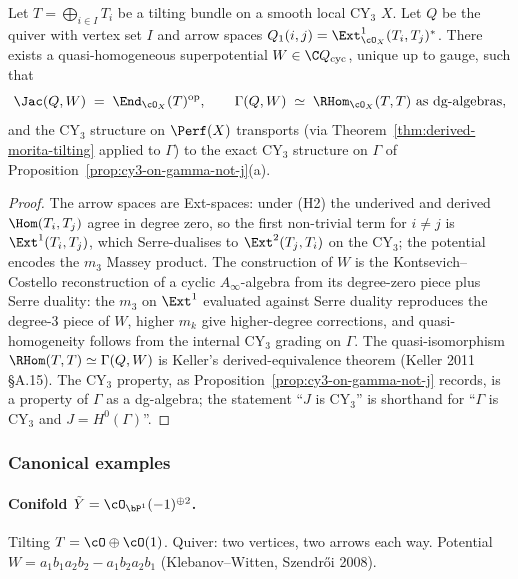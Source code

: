 \begin{theorem}
\label{thm:tilting-jacobi}
Let $T = \bigoplus_{i \in I} T_i$ be a tilting bundle on a
smooth local CY$_3$ $X$. Let $Q$ be the quiver with vertex set $I$ and arrow
spaces $Q_1(i,j) = \Ext^{1}_{\cO_X}(T_i, T_j)^{*}$. There exists a
quasi-homogeneous superpotential $W \in \C Q_{\mathrm{cyc}}$, unique up to
gauge, such that
\[
 \Jac(Q, W) \;=\; \End_{\cO_X}(T)^{\mathrm{op}},
 \qquad
 \Gamma(Q, W) \;\simeq\; \RHom_{\cO_X}(T, T) \text{ as dg-algebras},
\]
and the CY$_3$ structure on $\Perf(X)$ transports (via
Theorem~\ref{thm:derived-morita-tilting} applied to $\Gamma$) to the exact
CY$_3$ structure on $\Gamma$ of Proposition~\ref{prop:cy3-on-gamma-not-j}(a).
\end{theorem}

\begin{proof}
The arrow spaces are Ext-spaces: under (H2) the underived and derived
$\Hom(T_i, T_j)$ agree in degree zero, so the first non-trivial term for
$i \neq j$ is $\Ext^{1}(T_i, T_j)$, which Serre-dualises to
$\Ext^{2}(T_j, T_i)$ on the CY$_3$; the potential encodes the $m_3$ Massey
product. The construction of $W$ is the Kontsevich--Costello
reconstruction of a cyclic $A_\infty$-algebra from its degree-zero piece plus
Serre duality: the $m_3$ on $\Ext^1$ evaluated against Serre duality
reproduces the degree-3 piece of $W$, higher $m_k$ give higher-degree
corrections, and quasi-homogeneity follows from the internal CY$_3$ grading
on $\Gamma$. The quasi-isomorphism $\RHom(T, T) \simeq \Gamma(Q, W)$ is
Keller's derived-equivalence theorem (Keller 2011 \S A.15). The CY$_3$
property, as Proposition~\ref{prop:cy3-on-gamma-not-j} records, is a property
of $\Gamma$ as a dg-algebra; the statement ``$J$ is CY$_3$'' is shorthand for
``$\Gamma$ is CY$_3$ and $J = H^0(\Gamma)$''.
\end{proof}

\subsubsection{Canonical examples}

\paragraph{Conifold $\tilde Y = \cO_{\bP^1}(-1)^{\oplus 2}$.} Tilting
$T = \cO \oplus \cO(1)$. Quiver: two vertices, two arrows each way. Potential
$W = a_1 b_1 a_2 b_2 - a_1 b_2 a_2 b_1$ (Klebanov--Witten, Szendr\H{o}i 2008).

